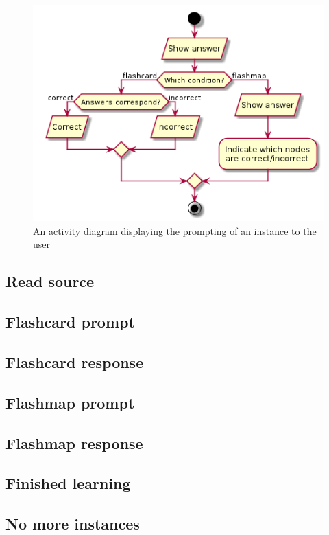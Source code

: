 \begin{figure}
    \centering
    \includegraphics[width=.8\textwidth]{img/learningclient.png}
    \caption{An activity diagram displaying the prompting of an instance to the user}
    \label{fig:learningclient}
\end{figure}

\subsection{Read source}

\subsection{Flashcard prompt}

\subsection{Flashcard response}

\subsection{Flashmap prompt}

\subsection{Flashmap response}

\subsection{Finished learning}

\subsection{No more instances}

